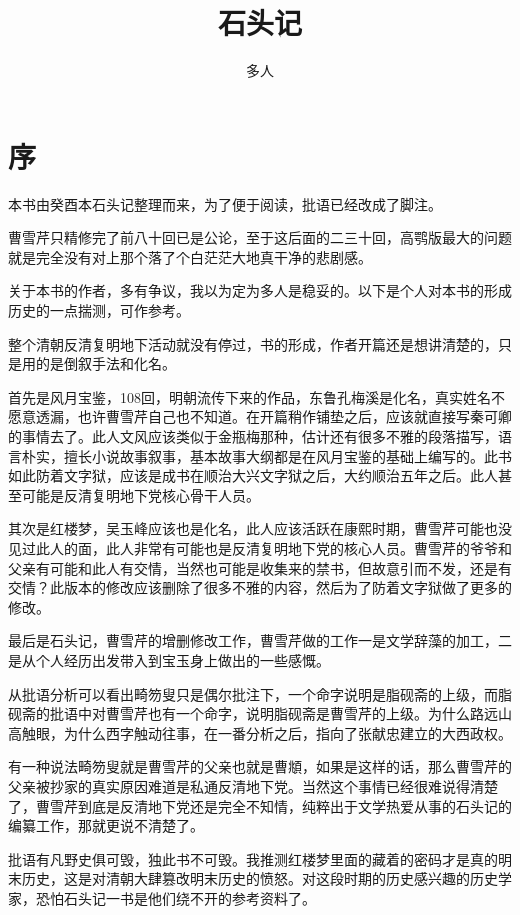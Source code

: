 \documentclass[12pt,oneside]{book}
\title{石头记}
\author{多人}
\begin{document}



\frontmatter 
{}
\chapter*{序}
本书由癸酉本石头记整理而来，为了便于阅读，批语已经改成了脚注。

曹雪芹只精修完了前八十回已是公论，至于这后面的二三十回，高鹗版最大的问题就是完全没有对上那个落了个白茫茫大地真干净的悲剧感。

关于本书的作者，多有争议，我以为定为多人是稳妥的。以下是个人对本书的形成历史的一点揣测，可作参考。

整个清朝反清复明地下活动就没有停过，书的形成，作者开篇还是想讲清楚的，只是用的是倒叙手法和化名。

首先是风月宝鉴，108回，明朝流传下来的作品，东鲁孔梅溪是化名，真实姓名不愿意透漏，也许曹雪芹自己也不知道。在开篇稍作铺垫之后，应该就直接写秦可卿的事情去了。此人文风应该类似于金瓶梅那种，估计还有很多不雅的段落描写，语言朴实，擅长小说故事叙事，基本故事大纲都是在风月宝鉴的基础上编写的。此书如此防着文字狱，应该是成书在顺治大兴文字狱之后，大约顺治五年之后。此人甚至可能是反清复明地下党核心骨干人员。

其次是红楼梦，吴玉峰应该也是化名，此人应该活跃在康熙时期，曹雪芹可能也没见过此人的面，此人非常有可能也是反清复明地下党的核心人员。曹雪芹的爷爷和父亲有可能和此人有交情，当然也可能是收集来的禁书，但故意引而不发，还是有交情？此版本的修改应该删除了很多不雅的内容，然后为了防着文字狱做了更多的修改。

最后是石头记，曹雪芹的增删修改工作，曹雪芹做的工作一是文学辞藻的加工，二是从个人经历出发带入到宝玉身上做出的一些感慨。

从批语分析可以看出畸笏叟只是偶尔批注下，一个命字说明是脂砚斋的上级，而脂砚斋的批语中对曹雪芹也有一个命字，说明脂砚斋是曹雪芹的上级。为什么路远山高触眼，为什么西字触动往事，在一番分析之后，指向了张献忠建立的大西政权。

有一种说法畸笏叟就是曹雪芹的父亲也就是曹頫，如果是这样的话，那么曹雪芹的父亲被抄家的真实原因难道是私通反清地下党。当然这个事情已经很难说得清楚了，曹雪芹到底是反清地下党还是完全不知情，纯粹出于文学热爱从事的石头记的编纂工作，那就更说不清楚了。

批语有凡野史俱可毁，独此书不可毁。我推测红楼梦里面的藏着的密码才是真的明末历史，这是对清朝大肆篡改明末历史的愤怒。对这段时期的历史感兴趣的历史学家，恐怕石头记一书是他们绕不开的参考资料了。
\end{document}
